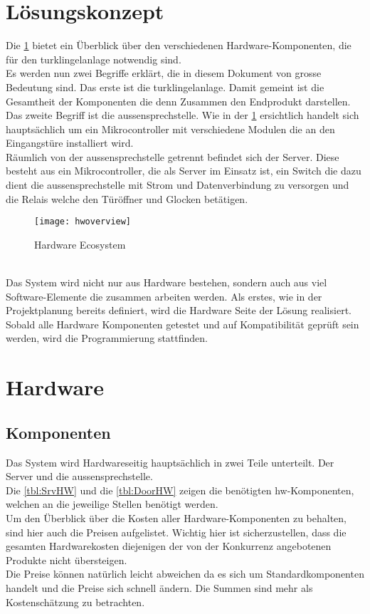\section{Lösungskonzept}
\label{sec:lösungskonzept}
Die \cref{fig:hwoverview} bietet ein Überblick über den verschiedenen Hardware-Komponenten, die für den \gls{turklingelanlage} notwendig sind. 
\\
Es werden nun zwei Begriffe erklärt, die in diesem Dokument von grosse Bedeutung sind. Das erste ist die \gls{turklingelanlage}. Damit gemeint ist die Gesamtheit der Komponenten die denn Zusammen den Endprodukt darstellen.
\\
Das zweite Begriff ist die \gls{aussensprechstelle}. Wie in der \cref{fig:hwoverview} ersichtlich handelt sich hauptsächlich um ein Mikrocontroller mit verschiedene Modulen die an den Eingangstüre installiert wird.
\\
Räumlich von der \gls{aussensprechstelle} getrennt befindet sich der Server. Diese besteht aus ein Mikrocontroller, die als Server im Einsatz ist, ein Switch die dazu dient die \gls{aussensprechstelle} mit Strom und Datenverbindung zu versorgen und die Relais welche den Türöffner und Glocken betätigen.
\begin{figure}[htb!]
	\begin{center}
		\texttt{[image: hwoverview]}
		\caption[Hardware Ecosystem]{Hardware Ecosystem}
		\label{fig:hwoverview}
	\end{center}
\end{figure}
\\
Das System wird nicht nur aus Hardware bestehen, sondern auch aus viel Software-Elemente die zusammen arbeiten werden. Als erstes, wie in der Projektplanung bereits definiert, wird die Hardware Seite der Lösung realisiert. Sobald alle Hardware Komponenten getestet und auf Kompatibilität geprüft sein werden, wird die Programmierung stattfinden.

\section{Hardware}
\label{sec:chapterexample}
\subsection{Komponenten}
Das System wird Hardwareseitig hauptsächlich in zwei Teile unterteilt. Der Server und die \gls{aussensprechstelle}.
\\
Die \cref{tbl:SrvHW} und die \cref{tbl:DoorHW} zeigen die benötigten \gls{hw}-Komponenten, welchen an die jeweilige Stellen benötigt werden.
\\
Um den Überblick über die Kosten aller Hardware-Komponenten zu behalten, sind hier auch die Preisen aufgelistet. Wichtig hier ist sicherzustellen, dass die gesamten Hardwarekosten diejenigen der von der Konkurrenz angebotenen Produkte nicht übersteigen.
\\
Die Preise können natürlich leicht abweichen da es sich um Standardkomponenten handelt und die Preise sich schnell ändern. Die Summen sind mehr als Kostenschätzung zu betrachten.

